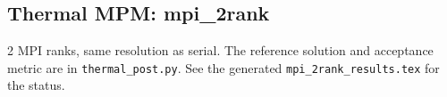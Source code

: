 \subsection{Thermal MPM: mpi\_2rank}
2 MPI ranks, same resolution as serial. The reference solution and acceptance metric are in \texttt{thermal\_post.py}. See the generated \texttt{mpi\_2rank\_results.tex} for the status.
